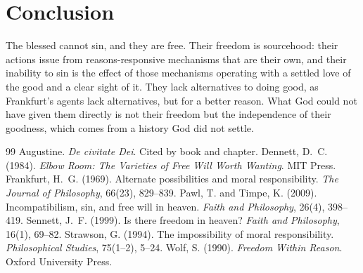 \documentclass{situationist-preprint}
\begin{document}
\section{Conclusion}

The blessed cannot sin, and they are free. Their freedom is sourcehood: their actions issue from reasons-responsive mechanisms that are their own, and their inability to sin is the effect of those mechanisms operating with a settled love of the good and a clear sight of it. They lack alternatives to doing good, as Frankfurt's agents lack alternatives, but for a better reason. What God could not have given them directly is not their freedom but the independence of their goodness, which comes from a history God did not settle.

\begin{thebibliography}{99}\small
{} Augustine. \emph{De civitate Dei}. Cited by book and chapter.
 Dennett, D.~C. (1984). \emph{Elbow Room: The Varieties of Free Will Worth Wanting}. MIT Press.
 Frankfurt, H.~G. (1969). Alternate possibilities and moral responsibility. \emph{The Journal of Philosophy}, 66(23), 829--839.
 Pawl, T. and Timpe, K. (2009). Incompatibilism, sin, and free will in heaven. \emph{Faith and Philosophy}, 26(4), 398--419.
 Sennett, J.~F. (1999). Is there freedom in heaven? \emph{Faith and Philosophy}, 16(1), 69--82.
 Strawson, G. (1994). The impossibility of moral responsibility. \emph{Philosophical Studies}, 75(1--2), 5--24.
 Wolf, S. (1990). \emph{Freedom Within Reason}. Oxford University Press.
\end{thebibliography}
\end{document}
